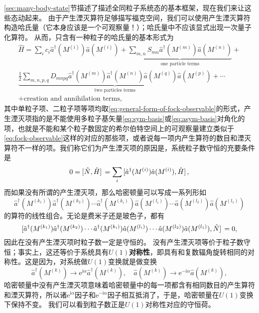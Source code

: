 \documentclass[UTF8, a4paper]{ctexart}
\newcommand*{\ii}{\mathrm{i}}
\newcommand*{\ee}{\mathrm{e}}
\begin{document}
\autoref{sec:many-body-state}节描述了描述全同粒子系统态的基本框架，现在我们来让这些态动起来。
由于产生湮灭算符足够描写福克空间，我们可以使用产生湮灭算符构造哈氏量（它本身应该是一个可观察量！）；哈氏量中不应该显式出现一次量子化算符。
从而，只含有一种粒子的哈氏量的基本形式为
\begin{equation}
    \begin{split}
        \hat{H} = \sum_i c_i \hat{a}^\dagger (M^{(i)}) \hat{a} (M^{(i)}) + \underbrace{\sum_{m, n} S_{mn} \hat{a}^\dagger (M^{(m)}) \hat{a} (M^{(n)}) }_\text{one particle terms} + \\
        \underbrace{\frac{1}{2} \sum_{m, n, p, q} D_{mnpq} \hat{a}^\dagger (M^{(m)}) \hat{a}^\dagger (M^{(n)}) \hat{a} (M^{(q)}) \hat{a} (M^{(p)}) }_\text{two particles terms} + \cdots \\
        + \text{creation and annihilation terms},
    \end{split}
    \label{eq:one-kind-many-body-hamitonian}
\end{equation}
其中单粒子项、二粒子项等项均取\eqref{eq:general-form-of-fock-observable}的形式，产生湮灭项指的是不能使用多粒子基矢量\eqref{eq:sym-basis}或\eqref{eq:asym-basis}对角化的项，也就是不能和某个粒子数固定的希尔伯特空间上的可观察量建立类似于\eqref{eq:fock-observable}这样的对应的那些项，或者说每一项内产生算符的数目和湮灭算符不一样的项。我们称它们为产生湮灭项的原因是，系统粒子数守恒的充要条件是
\begin{equation}
    0 = \comm*{\hat{N}}{\hat{H}} = \sum_i \comm*{\hat{a}^\dagger (M^{(i)}) \hat{a} (M^{(i)})}{\hat{H}},
\end{equation}
而如果没有所谓的产生湮灭项，那么哈密顿量可以写成一系列形如
\[
    \hat{a}^\dagger (M^{(k_1)}) \hat{a}^\dagger (M^{(k_2)}) \cdots \hat{a}^\dagger (M^{(k_i)}) \hat{a} (M^{(l_i)}) \cdots \hat{a} (M^{(l_2)}) \hat{a} (M^{(l_1)})
\]
的算符的线性组合。无论是费米子还是玻色子，都有
\[
    \comm*{\hat{a}^\dagger (M^{(k_1)}) \hat{a}^\dagger (M^{(k_2)}) \cdots \hat{a}^\dagger (M^{(k_i)}) \hat{a} (M^{(l_i)}) \cdots \hat{a} (M^{(l_2)}) \hat{a} (M^{(l_1)})}{\hat{N}} = 0,
\]
因此在没有产生湮灭项时粒子数一定是守恒的。
没有产生湮灭项等价于粒子数守恒；事实上，这还等价于系统具有\textbf{$U(1)$对称性}，即具有和复数辐角旋转相同的对称性。这是因为，对系统做$U(1)$变换就是做变换
\[
    \hat{a}^\dagger(M^{(k)}) \longrightarrow \ee^{\ii \alpha} \hat{a}^\dagger(M^{(k)}), \quad \hat{a}(M^{(k)}) \longrightarrow \ee^{-\ii \alpha} \hat{a}(M^{(k)}),
\]
哈密顿量中没有产生湮灭项意味着哈密顿量中的每一项都含有相同数目的产生算符和湮灭算符，所以诸$\ee^{\ii \alpha}$因子和$\ee^{-\ii \alpha}$因子相互抵消了，于是，哈密顿量在$U(1)$变换下保持不变。
我们可以看到粒子数正是$U(1)$对称性对应的守恒荷。
\end{document}
